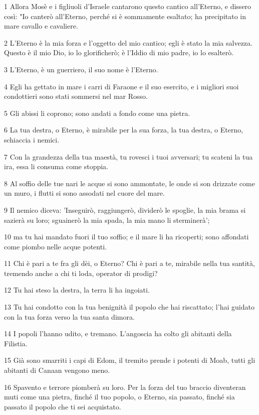 \par 1 Allora Mosè e i figliuoli d'Israele cantarono questo cantico all'Eterno, e dissero così: "Io canterò all'Eterno, perché si è sommamente esaltato; ha precipitato in mare cavallo e cavaliere.
\par 2 L'Eterno è la mia forza e l'oggetto del mio cantico; egli è stato la mia salvezza. Questo è il mio Dio, io lo glorificherò; è l'Iddio di mio padre, io lo esalterò.
\par 3 L'Eterno, è un guerriero, il suo nome è l'Eterno.
\par 4 Egli ha gettato in mare i carri di Faraone e il suo esercito, e i migliori suoi condottieri sono stati sommersi nel mar Rosso.
\par 5 Gli abissi li coprono; sono andati a fondo come una pietra.
\par 6 La tua destra, o Eterno, è mirabile per la sua forza, la tua destra, o Eterno, schiaccia i nemici.
\par 7 Con la grandezza della tua maestà, tu rovesci i tuoi avversari; tu scateni la tua ira, essa li consuma come stoppia.
\par 8 Al soffio delle tue nari le acque si sono ammontate, le onde si son drizzate come un muro, i flutti si sono assodati nel cuore del mare.
\par 9 Il nemico diceva: 'Inseguirò, raggiungerò, dividerò le spoglie, la mia brama si sazierà su loro; sguainerò la mia spada, la mia mano li sterminerà';
\par 10 ma tu hai mandato fuori il tuo soffio; e il mare li ha ricoperti; sono affondati come piombo nelle acque potenti.
\par 11 Chi è pari a te fra gli dèi, o Eterno? Chi è pari a te, mirabile nella tua santità, tremendo anche a chi ti loda, operator di prodigi?
\par 12 Tu hai steso la destra, la terra li ha ingoiati.
\par 13 Tu hai condotto con la tua benignità il popolo che hai riscattato; l'hai guidato con la tua forza verso la tua santa dimora.
\par 14 I popoli l'hanno udito, e tremano. L'angoscia ha colto gli abitanti della Filistia.
\par 15 Già sono smarriti i capi di Edom, il tremito prende i potenti di Moab, tutti gli abitanti di Canaan vengono meno.
\par 16 Spavento e terrore piomberà su loro. Per la forza del tuo braccio diventeran muti come una pietra, finché il tuo popolo, o Eterno, sia passato, finché sia passato il popolo che ti sei acquistato.
